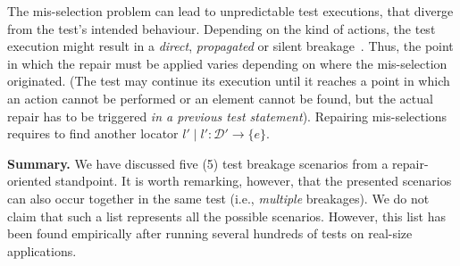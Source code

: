 The mis-selection problem can lead to unpredictable test executions, that diverge from the test's intended behaviour. Depending on the kind of actions, the test execution might result in a \textit{direct}, \textit{propagated} or silent breakage~\cite{Hammoudi-2016-ICST}. Thus, the point in which the repair must be applied varies depending on where the mis-selection originated. (The test may continue its execution until it reaches a point in which an action cannot be performed or an element cannot be found, but the actual repair has to be triggered \textit{in a previous test statement}).
Repairing mis-selections requires to find another locator $l' \mid l': \mathcal{D'} \rightarrow \{e\}$.

\noindent
\textbf{Summary.}
We have discussed five (5) test breakage scenarios from a repair-oriented standpoint. It is worth remarking, however, that the presented scenarios can also occur together in the same test (i.e., \textit{multiple} breakages). We do not claim that such a list represents all the possible scenarios. However, this list has been found empirically after running several hundreds of tests on real-size applications. 

